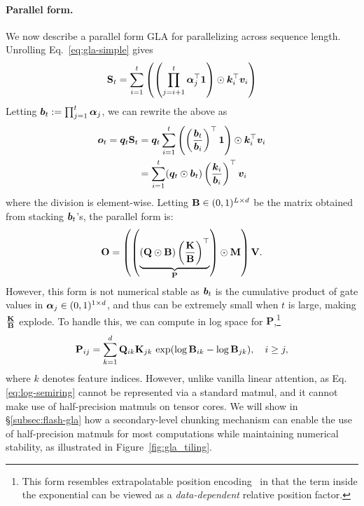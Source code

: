\paragraph{Parallel form.} 
We now describe a parallel form GLA for parallelizing across sequence length. Unrolling Eq.~\ref{eq:gla-simple} gives
\begin{equation*}
{\mathbf{S}}_t = \sum_{i=1}^{t} \left(\left(\prod_{j=i+1}^{t}{\bm{\alpha}}_{j}^{\top}\mathbf{1}\right) \odot {\bm{k}}_i^{\top} {\bm{v}}_i \right)    
\label{eq:gla_parallel}
\end{equation*}
Letting ${\bm{b}}_t := \prod_{j=1}^{t} {\bm{\alpha}}_j$, we can rewrite the above as 
\begin{align*}
{\bm{o}}_t = {\bm{q}}_t {\mathbf{S}}_t &= {\bm{q}}_t \sum_{i=1}^{t} \left( \left(\frac{{\bm{b}}_t}{{\bm{b}}_i} \right)^{\top} \mathbf{1} \right) \odot {\bm{k}}_i^{\top} {\bm{v}}_i \\ &= \sum_{i=1}^{t}({\bm{q}}_t \odot {\bm{b}}_t) \left(\frac{{\bm{k}}_i}{{\bm{b}}_i}\right)^{\top} {\bm{v}}_i
\end{align*}
where the division is element-wise. Letting ${\mathbf{B}} \in (0,1)^{L \times d}$ be the matrix obtained from stacking ${\bm{b}}_t$'s,  the parallel form is:
\begin{equation*}
{\mathbf{O}} = \left(\left(\underbrace{({\mathbf{Q}} \odot {\mathbf{B}}) \left(\frac{{\mathbf{K}}}{{\mathbf{B}}}\right)^{\top}}_{\mathbf{P}} \right) \odot {\mathbf{M}} \right) {\mathbf{V}}.
\label{eq:parallel_gla}
\end{equation*}
However, this form is not numerical stable as ${\bm{b}}_t$  is the cumulative product of gate values in ${\bm{\alpha}}_j \in (0, 1)^{1 \times d}$, and thus can be extremely small when $t$ is large, making $ \frac{\mathbf{K}}{{\mathbf{B}}}$ explode. To handle this, we can compute in log space for $\mathbf{P}$,\footnote{This form resembles extrapolatable position encoding~\citep{xpos} in that the term inside the exponential can be viewed as a  \textit{data-dependent} relative position factor. }
\begin{align}
    \vspace{-6mm}
    \mathbf{P}_{ij} = \sum_{k=1}^{d} \mathbf{Q}_{ik} \mathbf{K}_{jk} \, \exp(\log \rmB_{ik}-\log\rmB_{jk}), \quad i \ge j,
    \label{eq:log-semiring}
    \vspace{-6mm}
\end{align}
where $k$ denotes feature indices. 
However, unlike vanilla linear attention, as Eq. \ref{eq:log-semiring} cannot be represented via a standard matmul, and it cannot make use of half-precision matmuls on tensor cores. We will show in \S\ref{subsec:flash-gla} how a secondary-level chunking mechanism can enable the use of half-precision matmuls for most computations while maintaining numerical stability, as illustrated in Figure~\ref{fig:gla_tiling}.


